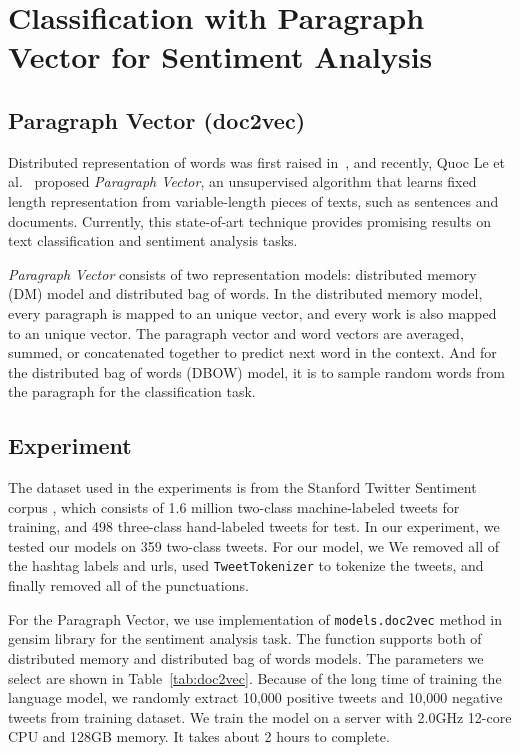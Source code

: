 \section{Classification with Paragraph Vector for Sentiment Analysis}\label{sec.doc2vec}

\subsection{Paragraph Vector (doc2vec)}
Distributed representation of words was first raised in~\cite{rumelhart1988}, and recently, Quoc Le et al.~\cite{le2014} proposed {\textit{Paragraph Vector}}, an unsupervised algorithm that learns fixed length representation from variable-length pieces of texts, such as sentences and documents. Currently, this state-of-art technique provides promising results on text classification and sentiment analysis tasks.

{\textit{Paragraph Vector}} consists of two representation models: distributed memory (DM) model and distributed bag of words. In the distributed memory model, every paragraph is mapped to an unique vector, and every work is also mapped to an unique vector. The paragraph vector and word vectors are averaged, summed, or concatenated together to predict next word in the context. And for the distributed bag of words (DBOW) model, it is to sample random words from the paragraph for the classification task.


\subsection{Experiment}
The dataset used in the experiments is from the Stanford Twitter Sentiment corpus \cite{go2009}, which consists of 1.6 million two-class machine-labeled tweets for training, and 498 three-class hand-labeled tweets for test. In our experiment, we tested our models on 359 two-class tweets. For our model, we We removed all of the hashtag labels and urls, used {\tt TweetTokenizer} to tokenize the tweets, and finally removed all of the punctuations. 

For the Paragraph Vector, we use implementation of {\tt models.doc2vec} method in gensim library for the sentiment analysis task. The function supports both of distributed memory and distributed bag of words models. The parameters we select are shown in Table~\ref{tab:doc2vec}. Because of the long time of training the language model, we randomly extract 10,000 positive tweets and 10,000 negative tweets from training dataset. We train the model on a server with 2.0GHz 12-core CPU and 128GB memory. It takes about 2 hours to complete.

